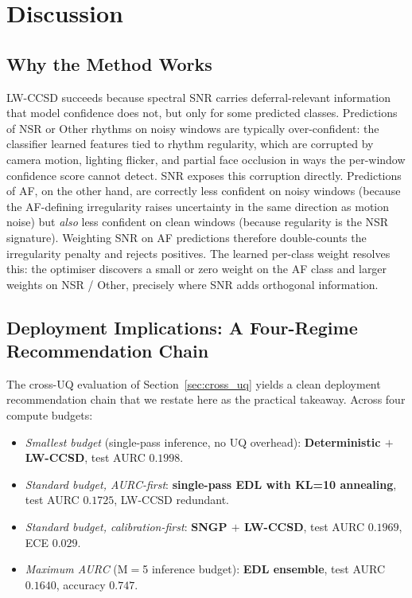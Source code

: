 \documentclass[journal]{IEEEtran}
\begin{document}
\section{Discussion}
\subsection{Why the Method Works}
LW-CCSD succeeds because spectral SNR carries deferral-relevant information that model confidence does not, but only for some predicted classes. Predictions of NSR or Other rhythms on noisy windows are typically over-confident: the classifier learned features tied to rhythm regularity, which are corrupted by camera motion, lighting flicker, and partial face occlusion in ways the per-window confidence score cannot detect. SNR exposes this corruption directly. Predictions of AF, on the other hand, are correctly less confident on noisy windows (because the AF-defining irregularity raises uncertainty in the same direction as motion noise) but \emph{also} less confident on clean windows (because regularity is the NSR signature). Weighting SNR on AF predictions therefore double-counts the irregularity penalty and rejects positives. The learned per-class weight resolves this: the optimiser discovers a small or zero weight on the AF class and larger weights on NSR / Other, precisely where SNR adds orthogonal information.

\subsection{Deployment Implications: A Four-Regime Recommendation Chain}
The cross-UQ evaluation of Section~\ref{sec:cross_uq} yields a clean deployment recommendation chain that we restate here as the practical takeaway. Across four compute budgets:
\begin{itemize}
\item \emph{Smallest budget} (single-pass inference, no UQ overhead): \textbf{Deterministic $+$ LW-CCSD}, test AURC $0.1998$.
\item \emph{Standard budget, AURC-first}: \textbf{single-pass EDL with KL=10 annealing}, test AURC $0.1725$, LW-CCSD redundant.
\item \emph{Standard budget, calibration-first}: \textbf{SNGP $+$ LW-CCSD}, test AURC $0.1969$, ECE $\mathbf{0.029}$.
\item \emph{Maximum AURC} (M$=$5 inference budget): \textbf{EDL ensemble}, test AURC $\mathbf{0.1640}$, accuracy $\mathbf{0.747}$.
\end{itemize}
\end{document}
